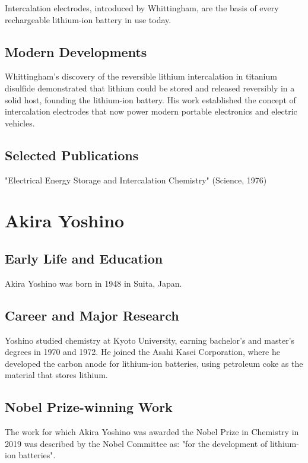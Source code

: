 Intercalation electrodes, introduced by Whittingham, are the basis of every rechargeable lithium-ion battery in use today.

\subsection*{Modern Developments}

Whittingham's discovery of the reversible lithium intercalation in titanium disulfide demonstrated that lithium could be stored and released reversibly in a solid host, founding the lithium-ion battery. His work established the concept of intercalation electrodes that now power modern portable electronics and electric vehicles.

\subsection*{Selected Publications}

"Electrical Energy Storage and Intercalation Chemistry" (Science, 1976)

\clearpage

\section{Akira Yoshino}

\subsection*{Early Life and Education}

Akira Yoshino was born in 1948 in Suita, Japan.

\subsection*{Career and Major Research}

Yoshino studied chemistry at Kyoto University, earning bachelor's and master's degrees in 1970 and 1972. He joined the Asahi Kasei Corporation, where he developed the carbon anode for lithium-ion batteries, using petroleum coke as the material that stores lithium.

\subsection*{Nobel Prize-winning Work}

The work for which Akira Yoshino was awarded the Nobel Prize in Chemistry in 2019 was described by the Nobel Committee as: "for the development of lithium-ion batteries".

